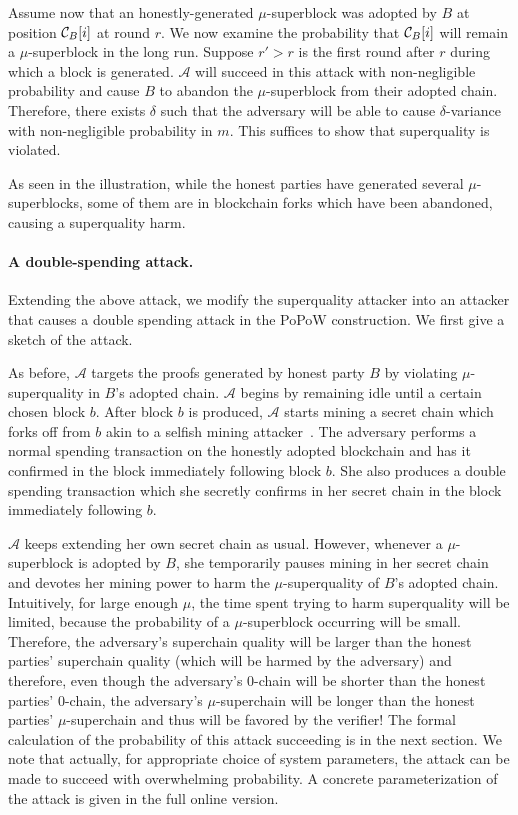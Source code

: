 Assume now that an honestly-generated $\mu$-superblock was adopted by $B$ at
position $\mathcal{C}_B[i]$ at round $r$. We now examine the probability that
$\mathcal{C}_B[i]$ will remain a $\mu$-superblock in the long run. Suppose $r' > r$
is the first round after $r$ during which a block is generated. $\mathcal{A}$
will succeed in this attack with non-negligible probability and cause $B$ to
abandon the $\mu$-superblock from their adopted chain. Therefore, there
exists $\delta$ such that the adversary will be able to cause $\delta$-variance
with non-negligible probability in $m$. This suffices to show that superquality
is violated.

As seen in the illustration, while the honest parties have generated several
$\mu$-superblocks, some of them are in blockchain forks which have been
abandoned, causing a superquality harm.

\paragraph{A double-spending attack.}
Extending the above attack, we modify the superquality attacker into an attacker
that causes a double spending attack in the PoPoW construction. We first give
a sketch of the attack.

As before, $\mathcal{A}$ targets the proofs generated by honest party $B$ by
violating $\mu$-superquality in $B$'s adopted chain. $\mathcal{A}$ begins by
remaining idle until a certain chosen block $b$. After block $b$ is produced,
$\mathcal{A}$ starts mining a secret chain which forks off from $b$ akin to a
selfish mining attacker~\cite{selfish}. The adversary performs a normal spending
transaction on the honestly adopted blockchain and has it confirmed in the block
immediately following block $b$. She also produces a double spending transaction
which she secretly confirms in her secret chain in the block immediately
following $b$.

$\mathcal{A}$ keeps extending her own secret chain as usual. However, whenever a
$\mu$-superblock is adopted by $B$, she temporarily pauses mining in her secret
chain and devotes her mining power to harm the $\mu$-superquality of $B$'s
adopted chain. Intuitively, for large enough $\mu$, the time spent trying to
harm superquality will be limited, because the probability of a $\mu$-superblock
occurring will be small. Therefore, the adversary's superchain quality will be
larger than the honest parties' superchain quality (which will be harmed by the
adversary) and therefore, even though the adversary's $0$-chain will be shorter
than the honest parties' $0$-chain, the adversary's $\mu$-superchain will be
longer than the honest parties' $\mu$-superchain and thus will be favored by the
verifier! The formal calculation of the probability of this attack succeeding is
in the next section. We note that  actually, for appropriate choice of system
parameters, the attack can be made to succeed with overwhelming probability.
A concrete parameterization of the attack is given in the
full online version.


